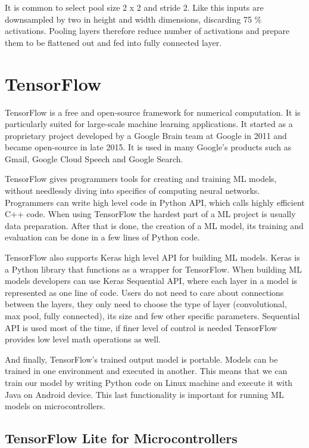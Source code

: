 It is common to select pool size 2 x 2 and stride 2.
Like this inputs are downsampled by two in height and width dimensions, discarding 75 \% activations.
Pooling layers therefore reduce number of activations and prepare them to be flattened out and fed into fully connected layer.

\section{ TensorFlow}

TensorFlow is a free and open-source framework for numerical computation.
It is particularly suited for large-scale machine learning applications\cite{geron}.
It started as a proprietary project developed by a Google Brain team at Google in 2011 and became open-source in late 2015.
It is used in many Google's products such as Gmail, Google Cloud Speech and Google Search.

TensorFlow gives programmers tools for creating and training ML models, without needlessly diving into specifics of computing neural networks.
Programmers can write high level code in Python API, which calls highly efficient C++ code.
When using TensorFlow the hardest part of a ML project is usually data preparation.
After that is done, the creation of a ML model, its training and evaluation can be done in a few lines of Python code.

TensorFlow also supports Keras high level API for building ML models. 
Keras is a Python library that functions as a wrapper for TensorFlow.
When building ML models developers can use Keras Sequential API, where each layer in a model is represented as one line of code.
Users do not need to care about connections between the layers, they only need to choose the type of layer (convolutional, max pool, fully connected), its size and few other specific parameters.
Sequential API is used most of the time, if finer level of control is needed TensorFlow provides low level math operations as well.

And finally, TensorFlow's trained output model is portable\cite{geron}.
Models can be trained in one environment and executed in another.
This means that we can train our model by writing Python code on Linux machine and execute it with Java on Android device.
This last functionality is important for running ML models on microcontrollers.

\subsection{ TensorFlow Lite for Microcontrollers} \label{tflite_quant}

